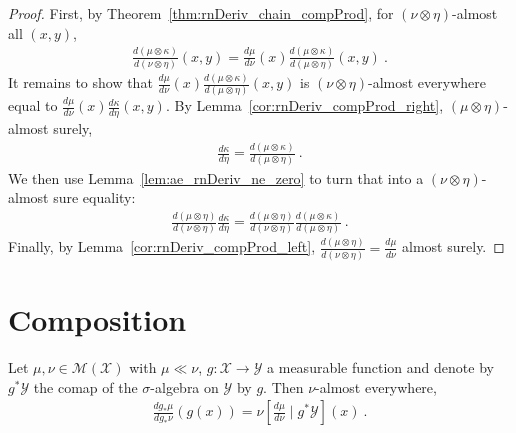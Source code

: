 \begin{proof}\mathlibok
{}
First, by Theorem~\ref{thm:rnDeriv_chain_compProd}, for $(\nu \otimes \eta)$-almost all $(x,y)$,
\begin{align*}
\frac{d(\mu \otimes \kappa)}{d(\nu \otimes \eta)}(x, y)
= \frac{d \mu}{d \nu}(x) \frac{d(\mu \otimes \kappa)}{d(\mu \otimes \eta)}(x, y)
\: .
\end{align*}
It remains to show that $\frac{d \mu}{d \nu}(x) \frac{d(\mu \otimes \kappa)}{d(\mu \otimes \eta)}(x, y)$ is $(\nu \otimes \eta)$-almost everywhere equal to $\frac{d\mu}{d\nu}(x)\frac{d \kappa}{d \eta}(x,y)$.
By Lemma~\ref{cor:rnDeriv_compProd_right}, $(\mu \otimes \eta)$-almost surely,
\begin{align*}
\frac{d \kappa}{d \eta} = \frac{d (\mu \otimes \kappa)}{d (\mu \otimes \eta)}
\: .
\end{align*}
We then use Lemma~\ref{lem:ae_rnDeriv_ne_zero} to turn that into a $(\nu \otimes \eta)$-almost sure equality:
\begin{align*}
\frac{d(\mu \otimes \eta)}{d(\nu \otimes \eta)}\frac{d \kappa}{d \eta} = \frac{d(\mu \otimes \eta)}{d(\nu \otimes \eta)}\frac{d (\mu \otimes \kappa)}{d (\mu \otimes \eta)}
\: .
\end{align*}
Finally, by Lemma~\ref{cor:rnDeriv_compProd_left}, $\frac{d(\mu \otimes \eta)}{d(\nu \otimes \eta)} = \frac{d\mu}{d\nu}$ almost surely.
\end{proof}


\section{Composition}


\begin{lemma}
  \label{lem:rnDeriv_map_eq_condexp}
  \mathlibok
  \uses{}
  Let $\mu, \nu \in \mathcal M(\mathcal X)$ with $\mu \ll \nu$, $g : \mathcal X \to \mathcal Y$ a measurable function and denote by $g^* \mathcal Y$ the comap of the $\sigma$-algebra on $\mathcal Y$ by $g$.
  Then $\nu$-almost everywhere,
  \begin{align*}
  \frac{d g_*\mu}{d g_*\nu}(g(x)) = \nu\left[ \frac{d \mu}{d \nu} \mid g^* \mathcal Y\right](x)
  \: .
  \end{align*}
\end{lemma}

